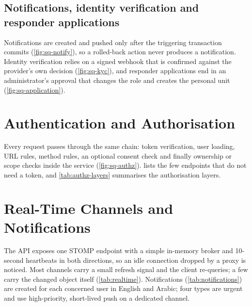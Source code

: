 \subsection{Notifications, identity verification and responder applications}\label{sec:after-commit}
Notifications are created and pushed only after the triggering transaction commits (\cref{fig:sq-notify}), so a
rolled-back action never produces a notification. Identity verification relies on a signed webhook that is confirmed
against the provider's own decision (\cref{fig:sq-kyc}), and responder applications end in an administrator's
approval that changes the role and creates the personal unit (\cref{fig:sq-application}).

\section{Authentication and Authorisation}\label{sec:authorisation}

Every request passes through the same chain: token verification, user loading, URL rules, method rules, an optional
consent check and finally ownership or scope checks inside the service (\cref{fig:sq-authz}). 
lists the few endpoints that do not need a token, and \cref{tab:authz-layers} summarises the authorisation layers.




\section{Real-Time Channels and Notifications}

The API exposes one STOMP endpoint with a simple in-memory broker and 10-second heartbeats in both directions, so an idle
connection dropped by a proxy is noticed. Most channels carry a small refresh signal and the client re-queries; a few
carry the changed object itself (\cref{tab:realtime}). Notifications (\cref{tab:notifications}) are created for each
concerned user in English and Arabic; four types are urgent and use high-priority, short-lived push on a dedicated channel.

